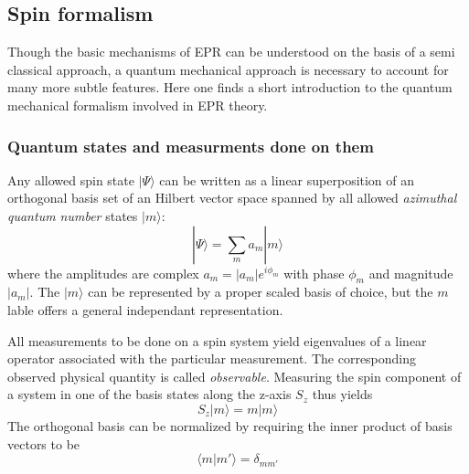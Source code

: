 \documentclass[11.5pt,a4paper]{article}
\begin{document}
\subsection{Spin formalism}
Though the basic mechanisms of EPR can be understood on the basis of a semi classical approach, a quantum mechanical approach is necessary to account for many more subtle features. Here one finds a short introduction to the quantum mechanical formalism involved in EPR theory. 
\subsubsection{Quantum states and measurments done on them}
Any allowed spin state $| \Psi \rangle$ can be written as a linear superposition of an orthogonal basis set of an Hilbert vector space spanned by all allowed \emph{azimuthal quantum number} states $| m \rangle$:
\begin{equation}
 | \Psi \rangle = \sum_m a_m | m \rangle 
\label{eq-orthonormal-basis}
\end{equation}
where the amplitudes are complex $a_m = |a_m| e^{i\phi_m}$ with phase $\phi_m$ and magnitude $|a_m|$. The $|m\rangle$ can be represented by a proper scaled basis of choice, but the $m$ lable offers a general independant representation.
 
All measurements to be done on a spin system yield eigenvalues of a linear operator associated with the particular measurement. The corresponding observed physical quantity is called \emph{observable}. Measuring the spin component of a system in one of the basis states along the z-axis $S_z$ thus yields
\begin{equation}
  S_z |m\rangle = m |m\rangle
\end{equation}
The orthogonal basis can be normalized by requiring the inner product of basis vectors to be
\begin{equation}
 \langle m|m'\rangle = \delta_{m m'}
  \label{eq-orthonormality}
\end{equation}
\end{document}

